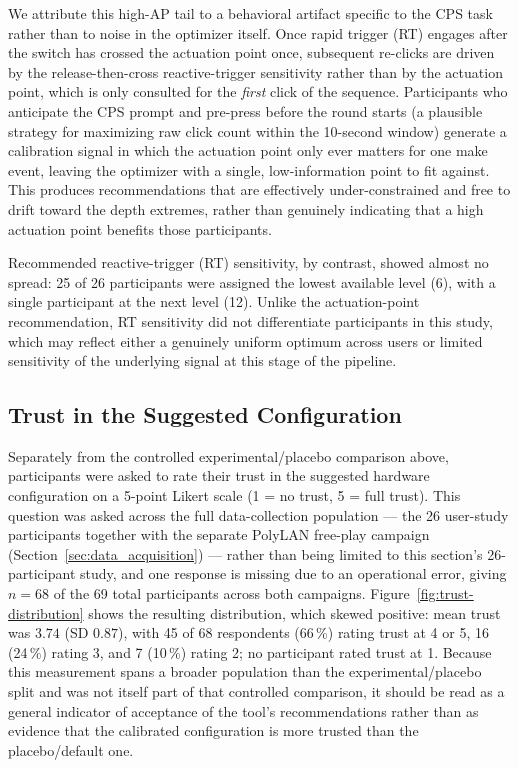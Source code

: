We attribute this high-AP tail to a behavioral artifact specific to the CPS
task rather than to noise in the optimizer itself. Once rapid trigger (RT)
engages after the switch has crossed the actuation point once, subsequent
re-clicks are driven by the release-then-cross reactive-trigger sensitivity
rather than by the actuation point, which is only consulted for the
\emph{first} click of the sequence. Participants who anticipate the CPS
prompt and pre-press before the round starts (a plausible strategy for
maximizing raw click count within the 10-second window) generate a
calibration signal in which the actuation point only ever matters for one
make event, leaving the optimizer with a single, low-information point to
fit against. This produces recommendations that are effectively
under-constrained and free to drift toward the depth extremes, rather than
genuinely indicating that a high actuation point benefits those
participants.

Recommended reactive-trigger (RT) sensitivity, by contrast, showed almost no
spread: 25 of 26 participants were assigned the lowest available level (6),
with a single participant at the next level (12). Unlike the actuation-point
recommendation, RT sensitivity did not differentiate participants in this
study, which may reflect either a genuinely uniform optimum across users or
limited sensitivity of the underlying signal at this stage of the pipeline.

\subsection{Trust in the Suggested Configuration}
\label{sec:eval-trust}
Separately from the controlled experimental/placebo comparison above,
participants were asked to rate their trust in the suggested hardware
configuration on a 5-point Likert scale (1 = no trust, 5 = full trust). This
question was asked across the full data-collection population --- the
26 user-study participants together with the separate PolyLAN free-play
campaign (Section~\ref{sec:data_acquisition}) --- rather than being limited
to this section's 26-participant study, and one response is missing due to
an operational error, giving $n=68$ of the 69 total participants across both
campaigns. Figure~\ref{fig:trust-distribution} shows the resulting
distribution, which skewed positive: mean trust was $3.74$ (SD $0.87$), with
45 of 68 respondents (66\,\%) rating trust at 4 or 5, 16 (24\,\%) rating 3,
and 7 (10\,\%) rating 2; no participant rated trust at 1. Because this
measurement spans a broader population than the experimental/placebo split
and was not itself part of that controlled comparison, it should be read as
a general indicator of acceptance of the tool's recommendations rather than
as evidence that the calibrated configuration is more trusted than the
placebo/default one.

